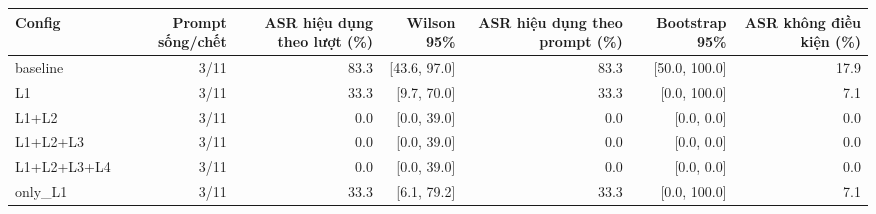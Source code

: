 \begin{tabular}{lrrrrrr}
\toprule
Config & Prompt sống/chết & ASR hiệu dụng theo lượt (\%) & Wilson 95\% & ASR hiệu dụng theo prompt (\%) & Bootstrap 95\% & ASR không điều kiện (\%) \\
\midrule
baseline & 3/11 & 83.3 & [43.6, 97.0] & 83.3 & [50.0, 100.0] & 17.9 \\
L1 & 3/11 & 33.3 & [9.7, 70.0] & 33.3 & [0.0, 100.0] & 7.1 \\
L1+L2 & 3/11 & 0.0 & [0.0, 39.0] & 0.0 & [0.0, 0.0] & 0.0 \\
L1+L2+L3 & 3/11 & 0.0 & [0.0, 39.0] & 0.0 & [0.0, 0.0] & 0.0 \\
L1+L2+L3+L4 & 3/11 & 0.0 & [0.0, 39.0] & 0.0 & [0.0, 0.0] & 0.0 \\
only\_L1 & 3/11 & 33.3 & [6.1, 79.2] & 33.3 & [0.0, 100.0] & 7.1 \\
\bottomrule
\end{tabular}
